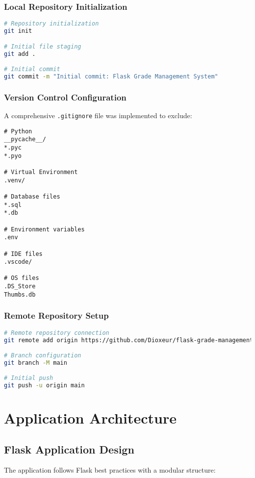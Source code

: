 \documentclass[12pt,a4paper]{article}
\begin{document}
\subsubsection{Local Repository Initialization}
\begin{lstlisting}[language=bash, caption=Git Initialization]
# Repository initialization
git init

# Initial file staging
git add .

# Initial commit
git commit -m "Initial commit: Flask Grade Management System"
\end{lstlisting}

\subsubsection{Version Control Configuration}
A comprehensive \texttt{.gitignore} file was implemented to exclude:

\begin{lstlisting}[caption=Git Ignore Configuration]
# Python
__pycache__/
*.pyc
*.pyo

# Virtual Environment
.venv/

# Database files
*.sql
*.db

# Environment variables
.env

# IDE files
.vscode/

# OS files
.DS_Store
Thumbs.db
\end{lstlisting}

\subsubsection{Remote Repository Setup}
\begin{lstlisting}[language=bash, caption=GitHub Integration]
# Remote repository connection
git remote add origin https://github.com/Dioxeur/flask-grade-management-system.git

# Branch configuration
git branch -M main

# Initial push
git push -u origin main
\end{lstlisting}

\section{Application Architecture}

\subsection{Flask Application Design}
The application follows Flask best practices with a modular structure:
\end{document}
